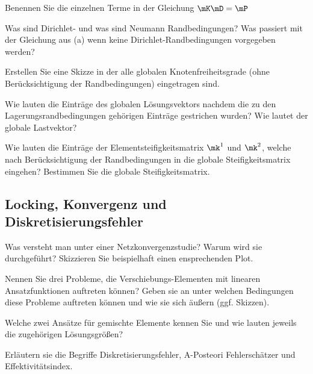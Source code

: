 \enab
\item Benennen Sie die einzelnen Terme in der Gleichung $\mK\mD=\mP$
\item Was sind Dirichlet- und was sind Neumann Randbedingungen? 
      Was passiert mit der Gleichung aus (a) wenn keine Dirichlet-Randbedingungen vorgegeben werden?
\item Erstellen Sie eine Skizze in der alle globalen Knotenfreiheitsgrade (ohne Berücksichtigung der Randbedingungen) eingetragen sind.
\item Wie lauten die Einträge des globalen Lösungsvektors nachdem die zu den Lagerungsrandbedingungen gehörigen Einträge gestrichen wurden? 
      Wie lautet der globale Lastvektor?
\item Wie lauten die Einträge der Elementsteifigkeitsmatrix $\mk^1$ und $\mk^2$, welche nach Berücksichtigung der Randbedingungen in die globale Steifigkeitsmatrix eingehen?
      Bestimmen Sie die globale Steifigkeitsmatrix.
\enae



\clearpage
\subsection{Locking, Konvergenz und Diskretisierungsfehler}

\enab
\item Was versteht man unter einer Netzkonvergenzstudie? Warum wird sie durchgeführt? Skizzieren Sie beispielhaft einen ensprechenden Plot.
\item Nennen Sie drei Probleme, die Verschiebungs-Elementen mit linearen Ansatzfunktionen auftreten können?
      Geben sie an unter welchen Bedingungen diese Probleme auftreten können und wie sie sich äußern (ggf. Skizzen).
\item Welche zwei Ansätze für gemischte Elemente kennen Sie und wie lauten jeweils die zugehörigen Lösungsgrößen?
\item Erläutern sie die Begriffe Diskretisierungsfehler, A-Posteori Fehlerschätzer und Effektivitätsindex.
\enae


